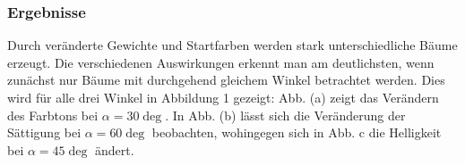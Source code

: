 \subsubsection{Ergebnisse}
Durch veränderte Gewichte und Startfarben werden stark unterschiedliche Bäume erzeugt.
Die verschiedenen Auswirkungen erkennt man am deutlichsten,
wenn zunächst nur Bäume mit durchgehend gleichem Winkel betrachtet werden.
Dies wird für alle drei Winkel in Abbildung 1 gezeigt:
Abb. (a) zeigt das Verändern des Farbtons bei $\alpha=30\deg$.
In Abb. (b) lässt sich die Veränderung der Sättigung bei $\alpha=60\deg$ beobachten, wohingegen sich in
Abb. c die Helligkeit bei $\alpha=45\deg$ ändert.
\begin{figure}[ht]
\centering
{}

\end{figure}
